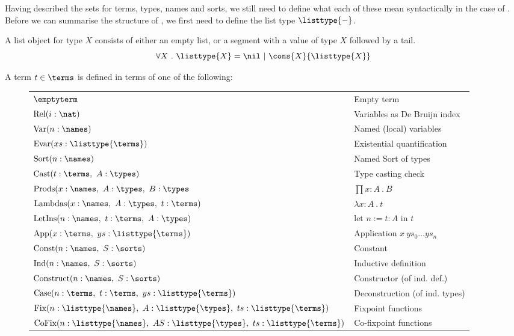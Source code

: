 Having described the sets for terms, types, names and sorts,
we still need to define what each of these mean syntactically in the case of \pcic.
Before we can summarise the structure of \pcic, we first need to define the list type $\listtype{-}$.

\begin{definition}[\listtype{-}]
	A list object for type $X$ consists of either an empty list, or a segment with a value of type $X$ followed by a tail.
	  \[ \forall X ~.~ \listtype{X} = \nil ~|~ \cons{X}{\listtype{X}} \]
  \end{definition}

\begin{definition}
	A \pcic term $t \in \terms$ is defined in terms of one of the following:

	\begin{figure}[H]
		\centering
		\begin{tabular}{ll}
			$\emptyterm$                                        & Empty term\glsadd{emptyterm} \\
			$\text{Rel}(i:\nat)$                       & Variables as De Bruijn \cite{de1972lambda} index \\
			$\text{Var}(n:\names)$                     & Named (local) variables \\
			$\text{Evar}(xs:\listtype{\terms}) $        & Existential quantification \\
			$\text{Sort}(n:\names)$                    & Named Sort of types \\
			$\text{Cast}(t:\terms,~ A:\types)$ & Type casting check \\
			$\text{Prods}(x:\names,~ A:\types,~ B:\types$ & $\prod x:A ~.~ B$ \\
			$\text{Lambdas}(x:\names,~ A:\types,~ t:\terms)$   & $\lambda x:A ~.~ t$ \\
			$\text{LetIns}(n:\names,~ t:\terms,~ A:\types)$    & $\text{let~} n := t : A \text{~in~} t$ \\
			$\text{App}(x:\terms,~ ys:\listtype{\terms})$ & Application $x~ys_0 \ldots ys_n$ \\
			$\text{Const}(n:\names,~ S:\sorts)$ & Constant \\
			$\text{Ind}(n:\names,~ S:\sorts)$  & Inductive definition \\
			$\text{Construct}(n:\names,~ S:\sorts)$ & Constructor (of ind. def.) \\
			$\text{Case}(n:\terms,~ t:\terms,~ ys:\listtype{\terms})$ & Deconstruction (of ind. types) \\
			$\text{Fix}(n:\listtype{\names},~ A:\listtype{\types},~ ts:\listtype{\terms})$ & Fixpoint functions \\
			$\text{CoFix}(n:\listtype{\names},~ AS:\listtype{\types},~ ts:\listtype{\terms})$ & Co-fixpoint functions \\
		\end{tabular}
	\end{figure}
\end{definition}

